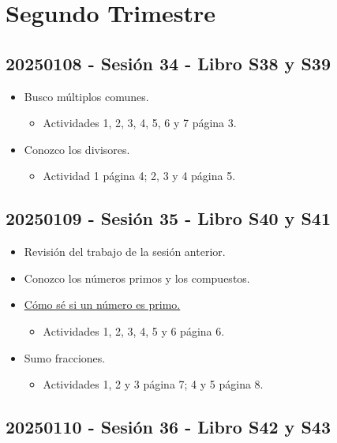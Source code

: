 \documentclass[a4paper,12pt]{article}
\begin{document}
\section{Segundo Trimestre}

\subsection{20250108 - Sesión 34 - Libro S38 y S39}

\begin{itemize}
    \item Busco múltiplos comunes.
    \begin{itemize}
        \item Actividades 1, 2, 3, 4, 5, 6 y 7 página 3.
    \end{itemize}
    \item Conozco los divisores.
    \begin{itemize}
        \item Actividad 1 página 4; 2, 3 y 4 página 5.
    \end{itemize}
\end{itemize}

\subsection{20250109 - Sesión 35 - Libro S40 y S41}

\begin{itemize}
    \item Revisión del trabajo de la sesión anterior.
    \item Conozco los números primos y los compuestos.
    \item \href{esPrimo.txt}{Cómo sé si un número es primo.}
    \begin{itemize}
        \item Actividades 1, 2, 3, 4, 5 y 6 página 6.
    \end{itemize}
    \item Sumo fracciones.
    \begin{itemize}
        \item Actividades 1, 2 y 3 página 7; 4 y 5 página 8.
    \end{itemize}
\end{itemize}

\subsection{20250110 - Sesión 36 - Libro S42 y S43}
\end{document}
